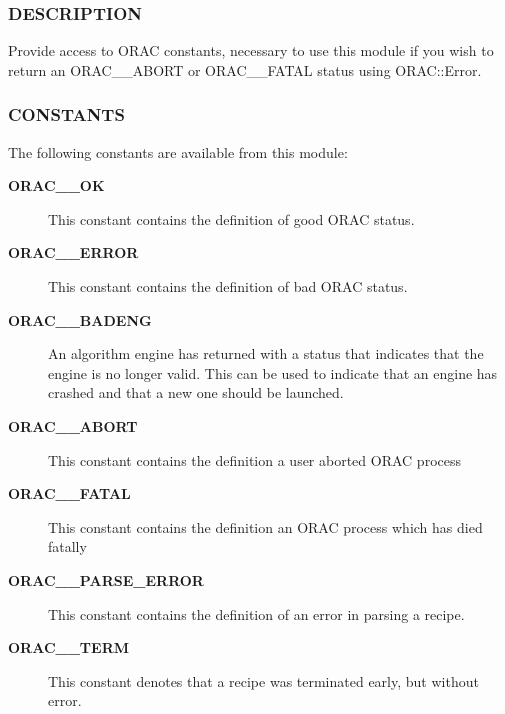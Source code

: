 \subsubsection*{DESCRIPTION\label{ORAC::Constants_DESCRIPTION}}


Provide access to ORAC constants, necessary to use this module if you wish
to return an ORAC\_\_ABORT or ORAC\_\_FATAL status using ORAC::Error.

\subsubsection*{CONSTANTS\label{ORAC::Constants_CONSTANTS}}


The following constants are available from this module:

\begin{description}

\item[{\textbf{ORAC\_\_OK}}] \mbox{}

This constant contains the definition of good ORAC status.


\item[{\textbf{ORAC\_\_ERROR}}] \mbox{}

This constant contains the definition of bad ORAC status.


\item[{\textbf{ORAC\_\_BADENG}}] \mbox{}

An algorithm engine has returned with a status that indicates
that the engine is no longer valid. This can be used to
indicate that an engine has crashed and that a new one should be
launched.


\item[{\textbf{ORAC\_\_ABORT}}] \mbox{}

This constant contains the definition a user aborted ORAC process


\item[{\textbf{ORAC\_\_FATAL}}] \mbox{}

This constant contains the definition an ORAC process which has died fatally


\item[{\textbf{ORAC\_\_PARSE\_ERROR}}] \mbox{}

This constant contains the definition of an error in parsing a recipe.


\item[{\textbf{ORAC\_\_TERM}}] \mbox{}

This constant denotes that a recipe was terminated early, but without
error.

\end{description}
